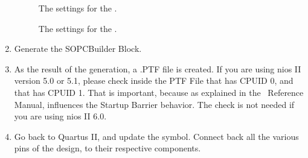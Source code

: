 \begin{enumerate}
\begin{figure}
\caption{\label{fig:tutorial_cpu0_settings}The settings for the .}
\end{figure}
%
\begin{figure}

\caption{\label{fig:tutorial_cpu1_settings}The settings for the .}
\end{figure}

\item Generate the SOPCBuilder Block.

\item As the result of the generation, a .PTF file is created. If you
  are using nios II version 5.0 or 5.1, please check inside the PTF
  File that  has CPUID 0, and that  has
  CPUID 1. That is important, because as explained in the \ee\
  Reference Manual, %
  influences the Startup Barrier behavior. The check is not needed if
  you are using nios II 6.0.

\item Go back to Quartus II, and update the symbol. Connect back all
  the various pins of the \const{standard} design, to their respective
  components.


\end{enumerate}
